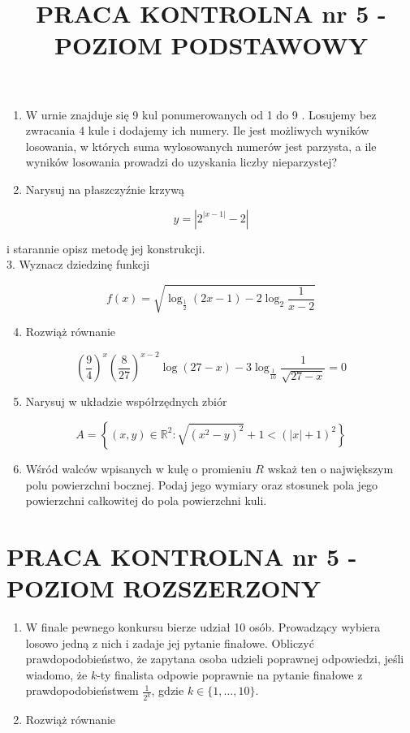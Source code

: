 \documentclass[10pt]{article}
\title{PRACA KONTROLNA nr 5 - POZIOM PODSTAWOWY }
\author{}
\date{}
\begin{document}
\maketitle
\begin{enumerate}
  \item W urnie znajduje się 9 kul ponumerowanych od 1 do 9 . Losujemy bez zwracania 4 kule i dodajemy ich numery. Ile jest możliwych wyników losowania, w których suma wylosowanych numerów jest parzysta, a ile wyników losowania prowadzi do uzyskania liczby nieparzystej?
  \item Narysuj na płaszczyźnie krzywą
\end{enumerate}

$$
y=\left|2^{|x-1|}-2\right|
$$

i starannie opisz metodę jej konstrukcji.\\
3. Wyznacz dziedzinę funkcji

$$
f(x)=\sqrt{\log _{\frac{1}{2}}(2 x-1)-2 \log _{2} \frac{1}{x-2}}
$$

\begin{enumerate}
  \setcounter{enumi}{3}
  \item Rozwiąż równanie
\end{enumerate}

$$
\left(\frac{9}{4}\right)^{x}\left(\frac{8}{27}\right)^{x-2} \log (27-x)-3 \log _{\frac{1}{10}} \frac{1}{\sqrt{27-x}}=0
$$

\begin{enumerate}
  \setcounter{enumi}{4}
  \item Narysuj w układzie współrzędnych zbiór
\end{enumerate}

$$
A=\left\{(x, y) \in \mathbb{R}^{2}: \sqrt{\left(x^{2}-y\right)^{2}}+1<(|x|+1)^{2}\right\}
$$

\begin{enumerate}
  \setcounter{enumi}{5}
  \item Wśród walców wpisanych w kulę o promieniu $R$ wskaż ten o największym polu powierzchni bocznej. Podaj jego wymiary oraz stosunek pola jego powierzchni całkowitej do pola powierzchni kuli.
\end{enumerate}

\section*{PRACA KONTROLNA nr 5 - POZIOM ROZSZERZONY}
\begin{enumerate}
  \item W finale pewnego konkursu bierze udział 10 osób. Prowadzący wybiera losowo jedną z nich i zadaje jej pytanie finałowe. Obliczyć prawdopodobieństwo, że zapytana osoba udzieli poprawnej odpowiedzi, jeśli wiadomo, że $k$-ty finalista odpowie poprawnie na pytanie finałowe z prawdopodobieństwem $\frac{1}{2^{k}}$, gdzie $k \in\{1, \ldots, 10\}$.
  \item Rozwiąż równanie
\end{enumerate}
\end{document}
